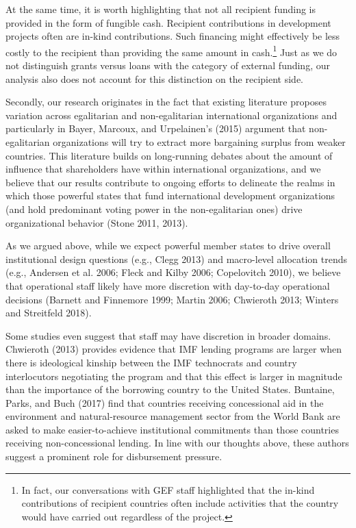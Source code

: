 \documentclass{article}
\begin{document}
At the same time, it is worth highlighting that not all recipient funding is provided in the form of fungible cash.  Recipient contributions in development projects often are in-kind contributions.  Such financing might effectively be less costly to the recipient than providing the same amount in cash.\footnote{In fact, our conversations with GEF staff highlighted that the in-kind contributions of recipient countries often include activities that the country would have carried out regardless of the project.}  Just as we do not distinguish grants versus loans with the category of external funding, our analysis also does not account for this distinction on the recipient side.

Secondly, our research originates in the fact that existing literature proposes variation across egalitarian and non-egalitarian international organizations and particularly in Bayer, Marcoux, and Urpelainen’s (2015) argument that non-egalitarian organizations will try to extract more bargaining surplus from weaker countries. This literature builds on long-running debates about the amount of influence that shareholders have within international organizations, and we believe that our results contribute to ongoing efforts to delineate the realms in which those powerful states that fund international development organizations (and hold predominant voting power in the non-egalitarian ones) drive organizational behavior (Stone 2011, 2013).  

As we argued above, while we expect powerful member states to drive overall institutional design questions (e.g., Clegg 2013) and macro-level allocation trends (e.g., Andersen et al. 2006; Fleck and Kilby 2006; Copelovitch 2010), we believe that operational staff likely have more discretion with day-to-day operational decisions (Barnett and Finnemore 1999; Martin 2006; Chwieroth 2013; Winters and Streitfeld 2018).
  
Some studies even suggest that staff may have discretion in broader domains.  Chwieroth (2013) provides evidence that IMF lending programs are larger when there is ideological kinship between the IMF technocrats and country interlocutors negotiating the program and that this effect is larger in magnitude than the importance of the borrowing country to the United States.  Buntaine, Parks, and Buch (2017) find that countries receiving concessional aid in the environment and natural-resource management sector from the World Bank are asked to make easier-to-achieve institutional commitments than those countries receiving non-concessional lending.  In line with our thoughts above, these authors suggest a prominent role for disbursement pressure.
\end{document}
